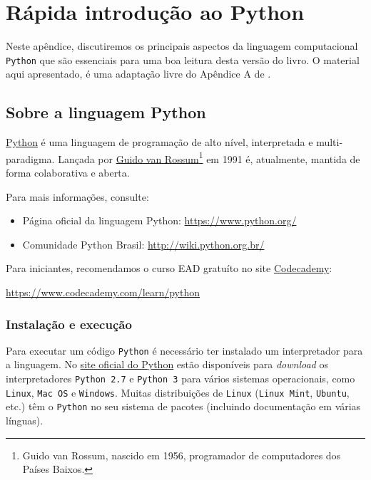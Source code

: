 
\chapter{Rápida introdução ao Python}\label{cap:python}

Neste apêndice, discutiremos os principais aspectos da linguagem computacional \verb+Python+ que são essenciais para uma boa leitura desta versão do livro. O material aqui apresentado, é uma adaptação livre do Apêndice A de \cite{CALSCI}.

\section{Sobre a linguagem Python}

\href{https://www.python.org/}{Python} é uma linguagem de programação de alto nível, interpretada e multi-paradigma. Lançada por \href{https://gvanrossum.github.io//}{Guido van Rossum}\footnote{Guido van Rossum, nascido em 1956, programador de computadores dos Países Baixos.} em 1991 é, atualmente, mantida de forma colaborativa e aberta.

Para mais informações, consulte:
\begin{itemize}
\item Página oficial da linguagem Python: \url{https://www.python.org/}
\item Comunidade Python Brasil: \url{http://wiki.python.org.br/}
\end{itemize}

Para iniciantes, recomendamos o curso EAD gratuíto no site \href{https://www.codecademy.com/}{Codecademy}:
\begin{center}
  \url{https://www.codecademy.com/learn/python}
\end{center}

\subsection{Instalação e execução}

Para executar um código \verb+Python+ é necessário ter instalado um interpretador para a linguagem. No \href{https://www.python.org/}{site oficial do Python} estão disponíveis para {\it download} os interpretadores \verb+Python 2.7+ e \verb+Python 3+ para vários sistemas operacionais, como \verb+Linux+, \verb+Mac OS+ e \verb+Windows+. Muitas distribuições de \verb+Linux+ (\verb+Linux Mint+, \verb+Ubuntu+, etc.) têm o \verb+Python+ no seu sistema de pacotes (incluindo documentação em várias línguas).

